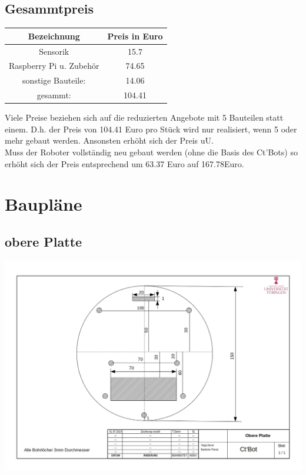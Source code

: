 \documentclass[twoside,12pt,a4paper]{report}
\begin{document}
	\section{Gesammtpreis}
	\begin{center}
		\begin{tabular}{|c|c|}
			\hline
			Bezeichnung				& Preis	in Euro	\\
			\hline
			Sensorik				& 15.7\\
			Raspberry Pi u. Zubehör	& 74.65\\
			sonstige Bauteile:		& 14.06\\
			\hline
			gesammt:				& 104.41\\
			\hline
		\end{tabular}
	\end{center}
	Viele Preise beziehen sich auf die reduzierten Angebote mit 5 Bauteilen statt einem. D.h. der Preis von 104.41 Euro pro Stück wird nur realisiert, wenn 5 oder mehr gebaut werden. Ansonsten erhöht sich der Preis uU. \\
	Muss der Roboter vollständig neu gebaut werden (ohne die Basis des Ct'Bots) so erhöht sich der Preis entsprechend um 63.37 Euro auf 167.78Euro. 
	
	\chapter{Baupläne}
	\section{obere Platte}
	\includegraphics[angle=90,origin=c, scale= 0.5]{images/Zeichnung_obere_Platte.jpg}
\end{document}
